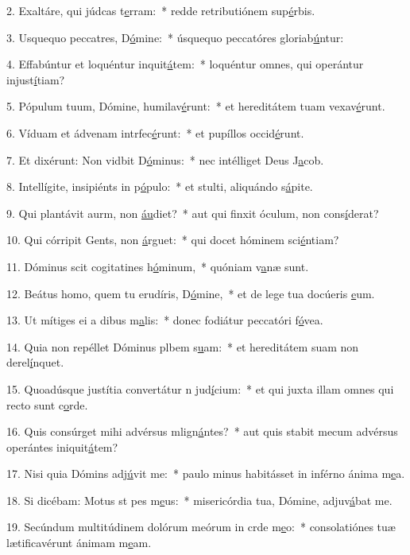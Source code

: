 2. Exaltáre, qui júdcas t\uline{e}rram:~* redde retributiónem sup\uline{é}rbis.\par 
3. Usquequo peccatres, D\uline{ó}mine:~* úsquequo peccatóres gloriab\uline{ú}ntur:\par 
4. Effabúntur et loquéntur inquit\uline{á}tem:~* loquéntur omnes, qui operántur injust\uline{í}tiam?\par 
5. Pópulum tuum, Dómine, humilav\uline{é}runt:~* et hereditátem tuam vexav\uline{é}runt.\par 
6. Víduam et ádvenam intrfec\uline{é}runt:~* et pupíllos occid\uline{é}runt.\par 
7. Et dixérunt: Non vidbit D\uline{ó}minus:~* nec intélliget Deus J\uline{a}cob.\par 
8. Intellígite, insipiénts in p\uline{ó}pulo:~* et stulti, aliquándo s\uline{á}pite.\par 
9. Qui plantávit aurm, non \uline{áu}diet?~* aut qui finxit óculum, non cons\uline{í}derat?\par 
10. Qui córripit Gents, non \uline{á}rguet:~* qui docet hóminem sci\uline{é}ntiam?\par 
11. Dóminus scit cogitatines h\uline{ó}minum,~* quóniam v\uline{a}næ sunt.\par 
12. Beátus homo, quem tu erudíris, D\uline{ó}mine,~* et de lege tua docúeris \uline{e}um.\par 
13. Ut mítiges ei a dibus m\uline{a}lis:~* donec fodiátur peccatóri f\uline{ó}vea.\par 
14. Quia non repéllet Dóminus plbem s\uline{u}am:~* et hereditátem suam non derel\uline{í}nquet.\par 
15. Quoadúsque justítia convertátur n jud\uline{í}cium:~* et qui juxta illam omnes qui recto sunt c\uline{o}rde.\par 
16. Quis consúrget mihi advérsus mlign\uline{á}ntes?~* aut quis stabit mecum advérsus operántes iniquit\uline{á}tem?\par 
17. Nisi quia Dómins adj\uline{ú}vit me:~* paulo minus habitásset in inférno ánima m\uline{e}a.\par 
18. Si dicébam: Motus st pes m\uline{e}us:~* misericórdia tua, Dómine, adjuv\uline{á}bat me.\par 
19. Secúndum multitúdinem dolórum meórum in crde m\uline{e}o:~* consolatiónes tuæ lætificavérunt ánimam m\uline{e}am.\par 
